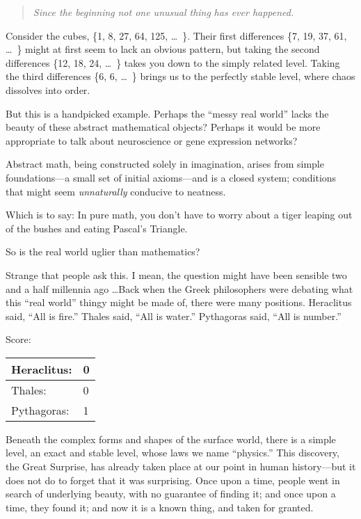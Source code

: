 \begin{quote}
{
 \textit{Since the beginning}\newline
\textit{ not one unusual thing}\newline
\textit{ has ever happened.}}
\end{quote}

\myendsectiontext


{
 Consider the cubes, \{1, 8, 27,
64, 125, \ldots~\}. Their first
differences \{7, 19, 37, 61,
\ldots~\} might at first seem to lack
an obvious pattern, but taking the second differences
\{12, 18, 24,
\ldots~\} takes you down to the simply
related level. Taking the third differences
\{6, 6,
\ldots~\} brings us to the perfectly
stable level, where chaos dissolves into order. }

{
 But this is a handpicked example. Perhaps the
``messy real world'' lacks the
beauty of these abstract mathematical objects? Perhaps it would be more
appropriate to talk about neuroscience or gene expression networks?}

{
 Abstract math, being constructed solely in imagination, arises
from simple foundations---a small set of initial axioms---and is a
closed system; conditions that might seem \textit{unnaturally}
conducive to neatness.}

{
 Which is to say: In pure math, you don't have to
worry about a tiger leaping out of the bushes and eating
Pascal's Triangle.}

{
 So is the real world uglier than mathematics?}

{
 Strange that people ask this. I mean, the question might have been
sensible two and a half millennia ago \ldots Back when the Greek
philosophers were debating what this ``real
world'' thingy might be made of, there were many
positions. Heraclitus said, ``All is
fire.'' Thales said, ``All is
water.'' Pythagoras said, ``All is
number.''}

{
 Score:}

\begin{center}
\begin{tabular}{|l|l|}
  \hline
  Heraclitus: & 0\\
  \hline
  Thales: & 0\\
  \hline
  Pythagoras: & 1\\
  \hline
\end{tabular}
\end{center}

{
 Beneath the complex forms and shapes of the surface world, there
is a simple level, an exact and stable level, whose laws we name
``physics.'' This discovery, the
Great Surprise, has already taken place at our point in human
history---but it does not do to forget that it was surprising. Once
upon a time, people went in search of underlying beauty, with no
guarantee of finding it; and once upon a time, they found it; and now
it is a known thing, and taken for granted.}

